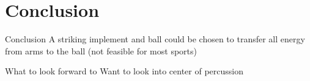 \documentclass[tikz]{beamer}
\begin{document}




\section{Conclusion}

\begin{frame} {Conclusion}
	A striking implement and ball could be chosen to transfer all energy from arms to the ball (not feasible for most sports)
\end{frame}

\begin{frame} {What to look forward to}
	Want to look into center of percussion
\end{frame}

\end{document}
